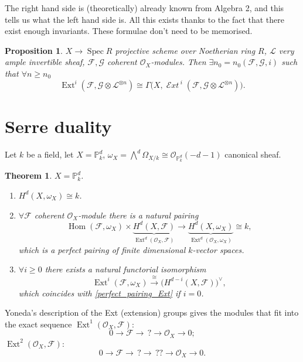 \documentclass[12pt]{article}
\DeclareMathOperator{\Hom}{Hom}
\DeclareMathOperator{\Spec}{Spec}
\DeclareMathOperator{\Ext}{Ext}
\DeclareMathOperator{\shExt}{\mathcal{E}\textit{xt}\,}
\newtheorem*{proposition}{Proposition}
\newtheorem*{theorem}{Theorem}
\theoremstyle{definition}
\begin{document}
The right hand side is (theoretically) already known from Algebra 2, and this tells us what the left hand side is. All this exists thanks to the fact that there exist enough invariants. These formulae don't need to be memorised.

\begin{proposition}
$X\rightarrow\Spec R$ projective scheme over Noetherian ring $R$, $\mathcal{L}$ very ample invertible sheaf, $\mathcal{F},\mathcal{G}$ coherent $\mathcal{O}_X$-modules. Then $\exists n_0=n_0(\mathcal{F},\mathcal{G},i)$ such that $\forall n\geq n_0$
\[\Ext^i(\mathcal{F},\mathcal{G}\otimes\mathcal{L}^{\otimes n})\cong\Gamma\big(X,\shExt^i(\mathcal{F},\mathcal{G}\otimes\mathcal{L}^{\otimes n})\big).\]
\end{proposition}

\section{Serre duality}
Let $k$ be a field, let $X=\mathbb{P}_k^d$, $\omega_X=\bigwedge^d\Omega_{X/k}\cong\mathcal{O}_{\mathbb{P}_k^d}(-d-1)$ canonical sheaf.

\begin{theorem}
$X=\mathbb{P}_k^d$.

\begin{enumerate}[label=\arabic*)]
\item $H^d(X,\omega_X)\cong k$.

\item\label{perfect_pairing_Ext} $\forall\mathcal{F}$ coherent $\mathcal{O}_X$-module there is a natural pairing
\[\Hom(\mathcal{F},\omega_X)\times\underbrace{H^d(X,\mathcal{F})}_{\Ext^d(\mathcal{O}_X,\mathcal{F})}\longrightarrow\underbrace{H^d(X,\omega_X)}_{\Ext^d(\mathcal{O}_X,\omega_X)}\cong k,\]
which is a perfect pairing of finite dimensional $k$-vector spaces.

\item $\forall i\geq0$ there exists a natural functorial isomorphism
\[\Ext^i(\mathcal{F},\omega_X)\overset{\cong}{\longrightarrow}\big(H^{d-i}(X,\mathcal{F})\big)^{\vee},\]
which coincides with \ref{perfect_pairing_Ext} if $i=0$.
\end{enumerate}
\end{theorem}

Yoneda's description of the Ext (extension) groups gives the modules that fit into the exact sequence $\Ext^1(\mathcal{O}_X,\mathcal{F})$:
\[0\longrightarrow\mathcal{F}\longrightarrow\,?\longrightarrow\mathcal{O}_X\longrightarrow0;\]
$\Ext^2(\mathcal{O}_X,\mathcal{F})$:
\[0\longrightarrow\mathcal{F}\longrightarrow\,?\longrightarrow\,??\longrightarrow\mathcal{O}_X\longrightarrow0.\]
\end{document}
